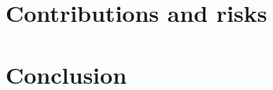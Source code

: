 \documentclass[ppgc,prop-tese,english]{iiufrgs}
\begin{document}
\chapter{Contributions and risks}
    \label{chpt:future}
    

\chapter{Conclusion}
    \label{chpt:closing}
    

%

%





\appendix



\end{document}
